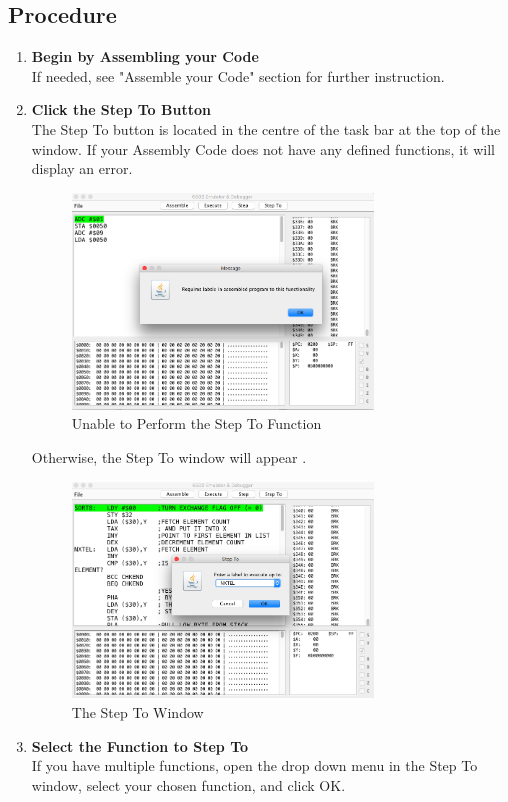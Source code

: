 \documentclass[a3paper, 11pt]{article}
\newlength{\drop}
\begin{document}
\subsection{Procedure}
\begin{enumerate}
	\item \textbf{Begin by Assembling your Code}\\
	If needed, see "Assemble your Code" section for further instruction.
	\item \textbf{Click the Step To Button}\\
	The Step To button is located in the centre of the task bar at the top of the window. If your Assembly Code does not have any defined functions, it will display an error.
	\begin{figure}[h!]
		\centering
		\includegraphics[width=8cm, height=5.74cm]{FailedStepTo}
		\caption{Unable to Perform the Step To Function}
	\end{figure}
	\par
	Otherwise, the Step To window will appear .
	\begin{figure}[h!]
		\centering
		\includegraphics[width=8cm, height=5.74cm]{StepToClosedMenu}
		\caption{The Step To Window}		
	\end{figure} 
	\item \textbf{Select the Function to Step To}\\
	If you have multiple functions, open the drop down menu in the Step To window, select your chosen function, and click OK. 

\end{enumerate}
\end{document}
